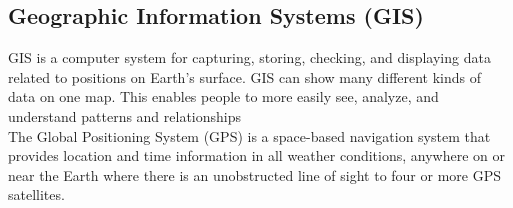 \subsection{Geographic Information Systems (GIS)}
GIS is a computer system for capturing, storing, checking, and displaying data related to positions on Earth’s surface. GIS can show many different kinds of data on one map. This enables people to more easily see, analyze, and understand patterns and relationships\\
The Global Positioning System (GPS) is a space-based navigation system that provides location and time information in all weather conditions, anywhere on or near the Earth where there is an unobstructed line of sight to four or more GPS satellites.\\
